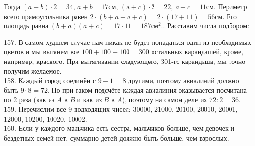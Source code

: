 \documentclass[12pt]{article}
\begin{document}
\begin{center}
\begin{figure}[ht!]
\end{figure}
\end{center}
Тогда $(a+b)\cdot2=34,\ a+b=17$см, $(a+c)\cdot2=22,\ a+c=11$см. Периметр всего прямоугольника равен $2\cdot(b+a+a+c)=2\cdot(17+11)=56$см. Его площадь равна $(b+a)(a+c)=17\cdot11=187\text{см}^2.$\newpage{}. Расставим числа подбором:
\begin{center}
\begin{figure}[ht!]
\end{figure}
\end{center}
157. В самом худшем случае нам никак не будет попадаться один из необходимых цветов и мы вытянем все $100+100+100=300$ остальных карандашей, кроме, например, красного. При вытягивании следующего, 301-го карандаша, мы точно получим желаемое.\\
158. Каждый город соединён с $9-1=8$ другими, поэтому авиалиний должно быть $9\cdot8=72.$ Но при таком подсчёте каждая авиалиния оказывается посчитана по 2 раза (как из $A$ в $B$ и как из $B$ в $A$), поэтому на самом деле их $72:2=36.$\\
159. Перечислим все 9 подходящих чисел: 30000, 21000, 20100, 20010, 20001, 12000, 10200, 10020, 10002.\\
160. Если у каждого мальчика есть сестра, мальчиков больше, чем девочек и бездетных семей нет, суммарно детей должно быть больше, чем взрослых.\\
\end{document}
